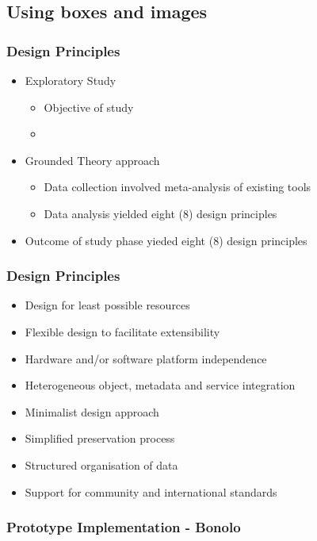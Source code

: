 \documentclass[xcolor=dvitex,t,11pt]{beamer}
\begin{document}
\subsection{Using boxes and images}

\begin{frame}[fragile]
\frametitle{Design Principles}
\begin{itemize}
\item Exploratory Study
\begin{itemize}
\item Objective of study
\item 
\end{itemize}
\item Grounded Theory approach
\begin{itemize}
\item Data collection involved meta-analysis of existing tools
\item Data analysis yielded eight (8) design principles
\end{itemize}
\item Outcome of study phase yieded eight (8) design principles
\end{itemize}
\end{frame}

\begin{frame}[fragile]
\frametitle{Design Principles}
\begin{itemize}
\item Design for least possible resources
\item Flexible design to facilitate extensibility
\item Hardware and/or software platform independence
\item Heterogeneous object, metadata and service integration
\item Minimalist design approach
\item Simplified preservation process
\item Structured organisation of data
\item Support for community and international standards
\end{itemize}

\end{frame}


\begin{frame}[fragile]
\frametitle{Prototype Implementation - Bonolo}
\begin{figure}
\centering
\framebox[\textwidth]{%

}
\end{figure}
\end{frame}
\end{document}
